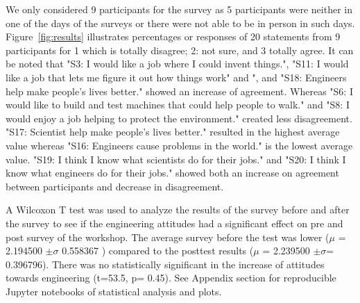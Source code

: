 \documentclass[sigconf]{acmart}
\begin{document}
We only considered 9 participants for the survey as 5 participants were neither in one of the days of the surveys or there were not able to be in person in such days. 
Figure~\ref{fig:results} illustrates percentages or responses of 20 statements from 9 participants for 1 which is totally disagree; 2: not sure, and 3 totally agree.
It can be noted that "S3: I would like a job where I could invent things.", "S11: I would like a job that lets me figure it out how things work"
and ", and "S18: Engineers help make people’s lives better." showed an increase of agreement. 
Whereas "S6: I would like to build and test machines that could help people to walk." and  "S8: I would enjoy a job helping to protect the environment." created less disagreement.
"S17: Scientist help make people’s lives better." resulted in the highest average value whereas "S16: Engineers cause problems in the world." is the lowest average value.
"S19: I think I know what scientists do for their jobs." and "S20: I think I know what engineers do for their jobs." showed both an increase on agreement between participants and decrease in disagreement.

A Wilcoxon T test was used to analyze the results of the survey before and after the survey to see if the engineering attitudes had a significant effect on pre and post survey of the workshop.
The average survey before the test was lower ($\mu$ = 2.194500 $\pm \sigma$ 0.558367 ) compared to the posttest results ($\mu$ = 2.239500 $\pm \sigma$= 0.396796).
There was no statistically significant in the increase of attitudes towards engineering (t=53.5, p= 0.45).
See Appendix section for reproducible Jupyter notebooks of statistical analysis and plots.

\end{document}
